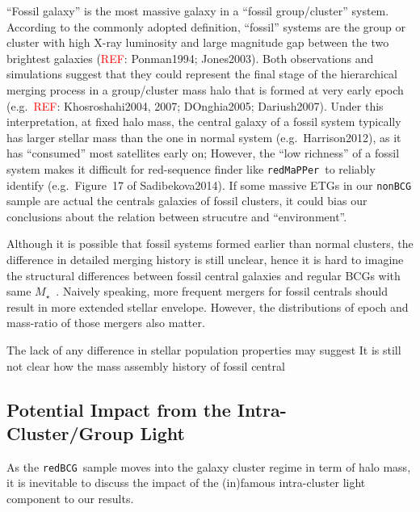 \documentclass[preprint]{aastex}
\def\redm{\texttt{redMaPPer}}
\def\mstar{{$M_{\star}$}~}
\def\rbcg{\texttt{redBCG}}
\newcommand{\addref}{{\textcolor{red}{REF}}}
\begin{document}
\begin{CJK*}{UTF8}{gbsn}
    ``Fossil galaxy'' is the most massive galaxy in a ``fossil group/cluster''
    system.
    According to the commonly adopted definition, ``fossil'' systems are the 
    group or cluster with high X-ray luminosity and large magnitude gap between 
    the two brightest galaxies (\addref: Ponman1994; Jones2003). 
    Both observations and simulations suggest that they could represent the 
    final stage of the hierarchical merging process in a group/cluster mass
    halo that is formed at very early epoch (e.g.\ \addref: 
    Khosroshahi2004, 2007; DOnghia2005; Dariush2007).
    Under this interpretation, at fixed halo mass, the central galaxy of 
    a fossil system typically has larger stellar mass than the one in normal 
    system (e.g.\ Harrison2012), as it has ``consumed'' most satellites 
    early on; 
    However, the ``low richness'' of a fossil system makes it difficult for 
    red-sequence finder like \redm~to reliably identify 
    (e.g.\ Figure~17 of Sadibekova2014).  
    If some massive ETGs in our \texttt{nonBCG} sample are actual the centrals 
    galaxies of fossil clusters, it could bias our conclusions about the 
    relation between strucutre and ``environment''.  
    
    Although it is possible that fossil systems formed earlier than normal 
    clusters, the difference in detailed merging history is still unclear, 
    hence it is hard to imagine the structural differences between fossil 
    central galaxies and regular BCGs with same \mstar.  
    Naively speaking, more frequent mergers for fossil centrals should result 
    in more extended stellar envelope.  
    However, the distributions of epoch and mass-ratio of those mergers also 
    matter.  
    
    The lack of any difference in stellar population properties may suggest 
    It is still not clear how the mass assembly history of fossil central 
    
\subsection{Potential Impact from the Intra-Cluster/Group Light}

    As the \rbcg\ sample moves into the galaxy cluster regime in term of halo 
    mass, it is inevitable to discuss the impact of the (in)famous
    intra-cluster light component to our results.




\end{CJK*}
\end{document}
